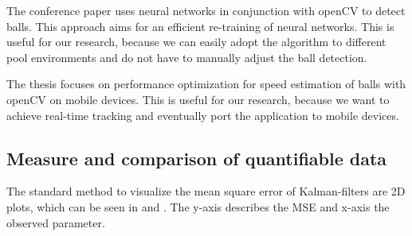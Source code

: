 \documentclass[titlepage, a4paper, 11pt]{scrartcl}
\begin{document}
The conference paper \citep{gabel2018jetson} uses neural networks in conjunction with openCV to detect balls.
This approach aims for an efficient re-training of neural networks. This is useful for our research, because we can easily adopt the algorithm to different pool environments and do not have to manually adjust the ball detection.

The thesis \citep{schmidt2016measuring} focuses on performance optimization for speed estimation of balls with openCV on mobile devices. This is useful for our research, because we want to achieve real-time tracking and eventually port the application to mobile devices.

\subsection{Measure and comparison of quantifiable data}

The standard method to visualize the mean square error of Kalman-filters are 2D plots,
which can be seen in \citep{8993001} and \citep{1165091}. The y-axis describes the MSE and x-axis the observed parameter. 

 

\end{document}
